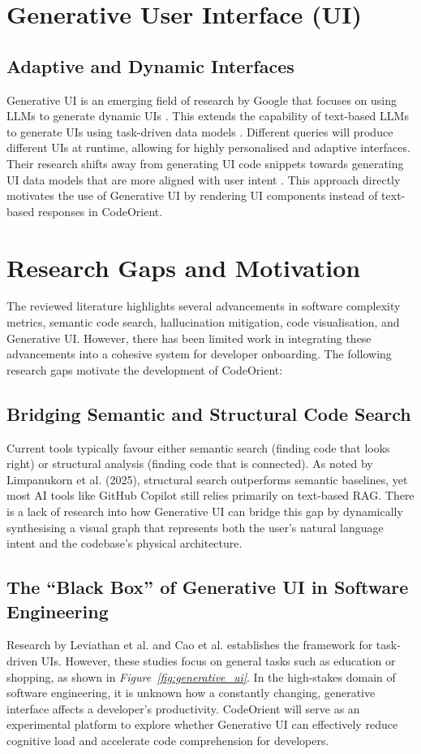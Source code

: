 \section{Generative User Interface (UI)}

\subsection{Adaptive and Dynamic Interfaces}
Generative UI is an emerging field of research by Google that focuses on using LLMs to generate dynamic UIs \cite{leviathan2025}. This extends the capability of text-based LLMs to generate UIs using task-driven data models \cite{cao2025}. Different queries will produce different UIs at runtime, allowing for highly personalised and adaptive interfaces. Their research shifts away from generating UI code snippets towards generating UI data models that are more aligned with user intent \cite{cao2025}. This approach directly motivates the use of Generative UI by rendering UI components instead of text-based responses in CodeOrient.

\section{Research Gaps and Motivation}
The reviewed literature highlights several advancements in software complexity metrics, semantic code search, hallucination mitigation, code visualisation, and Generative UI. However, there has been limited work in integrating these advancements into a cohesive system for developer onboarding. The following research gaps motivate the development of CodeOrient:

\subsection{Bridging Semantic and Structural Code Search}
Current tools typically favour either semantic search (finding code that looks right) or structural analysis (finding code that is connected). As noted by Limpanukorn et al. (2025), structural search outperforms semantic baselines, yet most AI tools like GitHub Copilot still relies primarily on text-based RAG. There is a lack of research into how Generative UI can bridge this gap by dynamically synthesising a visual graph that represents both the user's natural language intent and the codebase's physical architecture.

\subsection{The ``Black Box'' of Generative UI in Software Engineering}
Research by Leviathan et al. \cite{leviathan2025} and Cao et al. \cite{cao2025} establishes the framework for task-driven UIs. However, these studies focus on general tasks such as education or shopping, as shown in \textit{Figure~\ref{fig:generative_ui}}. In the high-stakes domain of software engineering, it is unknown how a constantly changing, generative interface affects a developer's productivity. CodeOrient will serve as an experimental platform to explore whether Generative UI can effectively reduce cognitive load and accelerate code comprehension for developers.

